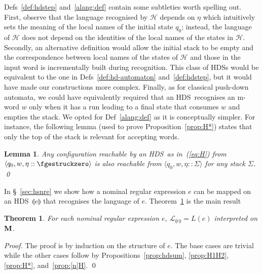 \documentclass[runningheads,a4paper]{llncs}
\newcommand{\longversion}[1]{#1}
\newcommand{\nretohds}[1]{\llparenthesis #1 \rrparenthesis}
\newcommand{\stk}{\Sigma}
\newcommand{\estk}{\fgestruckzero}
\newcommand{\lang}[1]{\mathcal{L}_{#1}}
\newcommand{\hdns}{HDS}
\newtheorem{theorem}{Theorem}[section]
\newtheorem{lemma}{Theorem}[section]
\newtheorem{theorem}{Theorem}[section]
\newtheorem{lemma}{Lemma}[section]
\newcommand{\tuple}[1]{\langle#1\rangle}
\begin{document}
Defs~\ref{def:hdstep} and~\ref{alang:def} contain some
subtleties worth spelling out.
First, observe that the language recognised by $\mathcal H$ depends on
$\eta$ which intuitively sets the meaning of the local names of the
initial state $q_0$; instead, the language of $\mathcal H$ does not
depend on the identities of the local names of the states in $\mathcal
H$.
Secondly, an alternative definition would allow the initial stack to
be empty and the correspondence between local names of the states of
$\mathcal H$ and those in the input word is incrementally built during
recognition.
This class of \hdns s would be equivalent to the one in
Defs~\ref{def:hd-automaton} and~\ref{def:hdstep}, but it would have
made our constructions more complex.
Finally, as for classical push-down automata, we could have
equivalently required that an \hdns\ recognises an m-word $w$ only
when it has a run leading to a final state that consumes $w$ and
empties the stack.
We opted for Def~\ref{alang:def} as it is conceptually simpler.
For instance, the following lemma (used to prove
Proposition~\ref{prop:H*}) states that only the top of the stack
is relevant for accepting words.
\begin{lemma}\label{lemma:top}
  Any configuration reachable by an \hdns\ as in~(\ref{eq:H}) from
  $\tuple{q_0,w,\eta :: \estk}$ is also reachable from
  $\tuple{q_0,w,\eta :: \stk}$ for any stack $\stk$.
\qed
\end{lemma}

In \S~\ref{sec:hsnre} we show how a nominal regular expression $e$ can
be mapped on an \hdns\ $\nretohds e$ that recognises the language of
$e$.
Theorem~\ref{thm:hdnsnre} is the main result
\begin{theorem}\label{thm:hdnsnre}
  For each nominal regular expression $e$, $\lang{\nretohds e} = L(e)$
  interpreted on $\mathbf{M}$.
\end{theorem}
\longversion{
  \begin{proof}
   The proof is by induction on the structure of $e$.
The base cases are trivial while the other cases follow by
   Propositions~\ref{prop:hdsum}, \ref{prop:H1H2}, \ref{prop:H*},
   and~\ref{prop:[n]H}.
\qed
 \end{proof}
}
\end{document}
